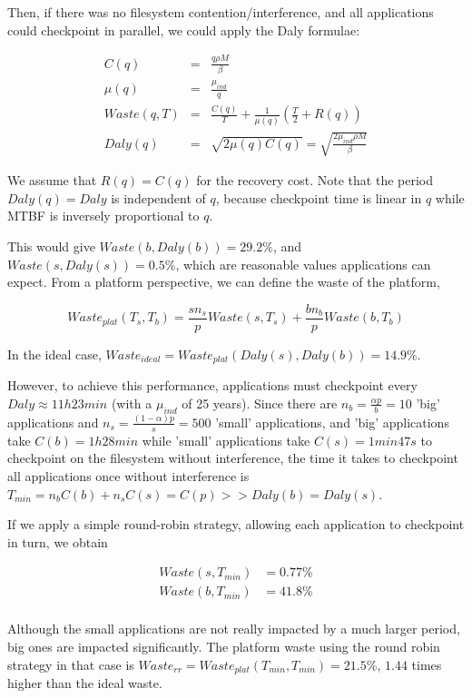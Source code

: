 \documentclass{article}
\begin{document}
Then, if there was no filesystem contention/interference, and all applications could checkpoint in parallel, we could apply the Daly formulae:

\begin{eqnarray}
C(q) &=& \frac{q\rho M}{\beta}\\
\mu(q) &=& \frac{\mu_{ind}}{q}\\
Waste(q, T) &=& \frac{C(q)}{T} + \frac{1}{\mu(q)}\left(\frac{T}{2}+R(q)\right)\\
Daly(q) &=& \sqrt{2\mu(q)C(q)} = \sqrt{\frac{2\mu_{ind}\rho M}{\beta}}
\end{eqnarray}

We assume that $R(q) =C(q)$ for the recovery cost. Note that the period $Daly(q)=Daly$ is independent of
$q$, because checkpoint time is linear in $q$ while MTBF is inversely proportional to $q$.

This would give $Waste(b, Daly(b)) = 29.2\%$, and $Waste(s, Daly(s)) = 0.5\%$, which are reasonable values applications can expect. From a platform perspective, we can define the waste of the platform,

$$Waste_{plat}(T_s, T_b) = \frac{s n_{s}}{p}Waste(s, T_s) + \frac{b n_{b}}{p}Waste(b, T_b)$$

In the ideal case, $Waste_{ideal} = Waste_{plat}(Daly(s), Daly(b)) = 14.9\%$.

However, to achieve this performance, applications must checkpoint every $Daly \approx 11h23min$ (with a $\mu_{ind}$ of 25 years).
Since there are $n_b = \frac{\alpha p}{b} = 10$ 'big' applications and $n_s = \frac{(1-\alpha)p}{s} = 500$ 'small' applications, and 'big' applications take $C(b) = 1h28min$ while 'small' applications take $C(s) = 1min47s$ to checkpoint on the filesystem without interference, the time it takes to checkpoint all applications once without interference is $T_{min} = n_bC(b) + n_sC(s) = C(p) >> Daly(b) = Daly(s)$.

If we apply a simple round-robin strategy, allowing each application to checkpoint in turn, we obtain

$$
\begin{array}{rl}
Waste(s, T_{min}) &= 0.77\%\\
Waste(b, T_{min}) &= 41.8\%\\
\end{array}
$$

Although the small applications are not really impacted by a much larger period, big ones are impacted significantly. The platform waste using the round robin strategy in that case is $Waste_{rr} = Waste_{plat}(T_{min}, T_{min}) = 21.5\%$, $1.44$ times higher than the ideal waste.
\end{document}
